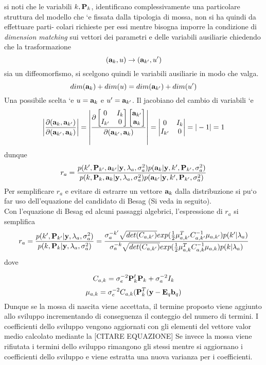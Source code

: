 si noti che le variabili $k,\textbf{P}_k$, identificano complessivamente una particolare struttura
del modello che `e fissata dalla tipologia di mossa, non si ha quindi da effettuare parti-
colari richieste per essi mentre bisogna imporre la condizione di \textit{ dimension matching}
sui vettori dei parametri e delle variabili ausiliarie chiedendo che la trasformazione\\
\begin{equation}
(\textbf{a}_k,u)\rightarrow(\textbf{a}_{k'},u')
\end{equation}
sia un diffeomorfismo, si scelgono quindi le variabili ausiliarie in modo che valga.
\begin{equation}
dim(\textbf{a}_k)+dim(u)=dim(\textbf{a}_{k'})+dim(u')
\end{equation}
Una possibile scelta `e $u = \textbf{a}_k$ e $u' =\textbf{a}_{k'}$. Il jacobiano del cambio di variabili `e
\begin{equation}
\left\vert\frac{\partial(\textbf{a}_k,\textbf{a}_{k'})}{\partial(\textbf{a}_{k'},\textbf{a}_k)}\right\vert=
\left\vert\frac{\partial\begin{bmatrix}
0 & I_k \\ 
I_{k'} & 0
\end{bmatrix}
 \begin{bmatrix}
\textbf{a}_{k'} \\ 
\textbf{a}_k
\end{bmatrix} }{\partial(\textbf{a}_{k'},\textbf{a}_k)}\right\vert
=\begin{vmatrix}
0 & I_k \\ 
I_{k'} & 0
\end{vmatrix}=|-1|=1
\end{equation}
dunque
\begin{equation}
r_a=\frac{p(k',\textbf{P}_{k'},\textbf{a}_{k'} |\textbf{y},\lambda_a,\sigma_a^2)p(\textbf{a}_k|\textbf{y},k',\textbf{P}_{k'},\sigma_a^2)}{p(k,\textbf{P}_k,\textbf{a}_k |\textbf{y},\lambda_a,\sigma_a^2)p(\textbf{a}_{k'}|\textbf{y},k',\textbf{P}_{k'},\sigma_a^2)}
\end{equation}
Per semplificare $r_a$ e evitare di estrarre un vettore $\textbf{a}_k$ dalla distribuzione si pu`o far
uso dell’equazione del candidato di Besag (Si veda in seguito).\\
Con l’equazione di Besag ed alcuni passaggi algebrici, l’espressione di $r_a$ si semplifica
\begin{equation}
r_a=\frac{p(k',\textbf{P}_{k'}|\textbf{y},\lambda_a,\sigma_a^2)}{p(k,\textbf{P}_k|\textbf{y},\lambda_a,\sigma_a^2)}=\frac{\sigma_a^{-k'}\sqrt{det(C_{a,k'})}
exp(\frac{1}{2}\mu_{a,k'}^TC_{a,k'}^{-1}\mu_{a,k'})p(k'|\lambda_a)}{\sigma_a^{-k}\sqrt{det(C_{a,k'})}
exp(\frac{1}{2}\mu_{a,k}^TC_{a,k}^{-1}\mu_{a,k})p(k|\lambda_a)}
\end{equation}
dove

\begin{equation}
C_{a,k}=\sigma_e^{-2}\textbf{P}_k^t\textbf{P}_k+\sigma_a^{-2}I_k
\end{equation}
\begin{equation}
\mu_{a,k}=\sigma_e^{-2}C_{a,k}(\textbf{P}_k^T(\textbf{y}-\textbf{E}_q\textbf{b}_q)
\end{equation}
Dunque se la mossa di nascita viene accettata, il termine proposto viene aggiunto
allo sviluppo incrementando di conseguenza il conteggio del numero di termini. I
coefficienti dello sviluppo vengono aggiornati con gli elementi del vettore valor medio
calcolato mediante la [CITARE EQUAZIONE]
Se invece la mossa viene rifiutata i termini dello sviluppo rimangono gli stessi mentre
si aggiornano i coefficienti dello sviluppo e viene estratta una nuova varianza per i
coefficienti.
